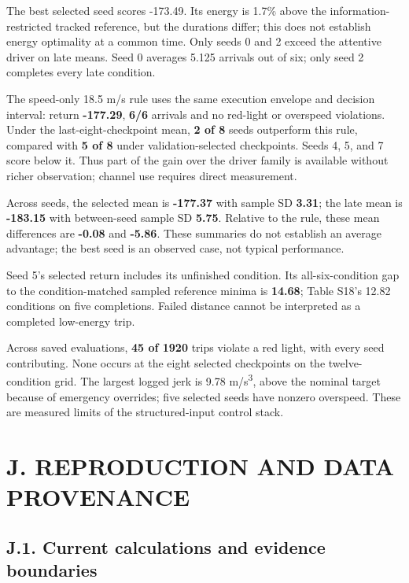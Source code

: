 \documentclass[letterpaper,journal,onecolumn]{IEEEtran}
\begin{document}
The best selected seed scores -173.49. Its energy is 1.7\% above the information-restricted tracked reference, but the durations differ; this does not establish energy optimality at a common time. Only seeds 0 and 2 exceed the attentive driver on late means. Seed 0 averages 5.125 arrivals out of six; only seed 2 completes every late condition.

The speed-only 18.5 m/s rule uses the same execution envelope and decision interval: return \textbf{-177.29}, \textbf{6/6} arrivals and no red-light or overspeed violations. Under the last-eight-checkpoint mean, \textbf{2 of 8} seeds outperform this rule, compared with \textbf{5 of 8} under validation-selected checkpoints. Seeds 4, 5, and 7 score below it. Thus part of the gain over the driver family is available without richer observation; channel use requires direct measurement.

Across seeds, the selected mean is \textbf{-177.37} with sample SD \textbf{3.31}; the late mean is \textbf{-183.15} with between-seed sample SD \textbf{5.75}. Relative to the rule, these mean differences are \textbf{-0.08} and \textbf{-5.86}. These summaries do not establish an average advantage; the best seed is an observed case, not typical performance.

Seed 5's selected return includes its unfinished condition. Its all-six-condition gap to the condition-matched sampled reference minima is \textbf{14.68}; Table S18's 12.82 conditions on five completions. Failed distance cannot be interpreted as a completed low-energy trip.

Across saved evaluations, \textbf{45 of 1920} trips violate a red light, with every seed contributing. None occurs at the eight selected checkpoints on the twelve-condition grid. The largest logged jerk is 9.78 m/s\textsuperscript{3}, above the nominal target because of emergency overrides; five selected seeds have nonzero overspeed. These are measured limits of the structured-input control stack.

\FloatBarrier{}\section*{J. REPRODUCTION AND DATA PROVENANCE}\setcounter{subsection}{0}

\subsection*{J.1. Current calculations and evidence boundaries}
\end{document}
